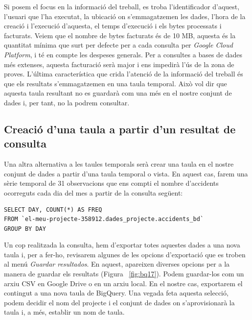 \documentclass[12pt,longbibliography]{article}
\theoremstyle{definition}
\theoremstyle{remark}
\begin{document}
Si posem el focus en la informació del treball, es troba l'identificador d'aquest, l'usuari que l'ha executat, la ubicació on s'emmagatzemen les dades, l'hora de la creació i l'execució d'aquesta, el temps d'execució i els bytes processats i facturats. Veiem que el nombre de bytes facturats és de 10 MB, aquesta és la quantitat mínima que surt per defecte per a cada consulta per \textit{Google Cloud Platform}, i té en compte les despeses generals. Per a consultes a bases de dades més extenses, aquesta facturació serà major i ens impedirà l'ús de la zona de proves. L'última característica que crida l'atenció de la informació del treball és que els resultats s'emmagatzemen en una taula temporal. Això vol dir que aquesta taula resultant no es guardarà com una més en el nostre conjunt de dades i, per tant, no la podrem consultar.



\subsection{Creació d'una taula a partir d'un resultat de consulta}

Una altra alternativa a les taules temporals serà crear una taula en el nostre conjunt de dades a partir d'una taula temporal o vista. En aquest cas, farem una sèrie temporal de 31 observacions que ens compti el nombre d'accidents ocorreguts cada dia del mes a partir de la consulta següent:

\begin{verbatim}
SELECT DAY, COUNT(*) AS FREQ
FROM `el-meu-projecte-358912.dades_projecte.accidents_bd`
GROUP BY DAY
\end{verbatim}

Un cop realitzada la consulta, hem d'exportar totes aquestes dades a una nova taula i, per a fer-ho, revisarem algunes de les opcions d'exportació que es troben al menú \textit{Guardar resultados}. En aquest, apareixen diverses opcions per a la manera de guardar els resultats (Figura ~\ref{fig:bq17}). Podem guardar-los com un arxiu CSV en Google Drive o en un arxiu local. En el nostre cas, exportarem el contingut a una nova taula de BigQuery. Una vegada feta aquesta selecció, podem decidir el nom del projecte i el conjunt de dades on s'aprovisionarà la taula i, a més, establir un nom de taula. 
\end{document}
